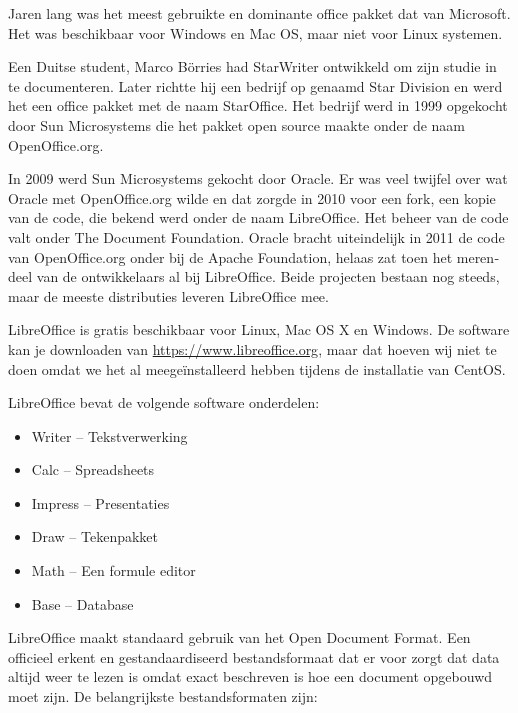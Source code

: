 Jaren lang was het meest gebruikte en dominante office pakket dat van Microsoft. Het was
beschikbaar voor Windows en Mac OS, maar niet voor Linux systemen.

Een Duitse student, Marco B\"orries had StarWriter ontwikkeld om zijn studie in te documenteren. Later richtte hij een bedrijf op genaamd Star
Division en werd het een office pakket met de naam StarOffice. Het bedrijf werd in 1999 opgekocht door Sun Microsystems
die het pakket open source maakte onder de naam OpenOffice.org.

{
\foreignlanguage{dutch}{In 2009 werd Sun Microsystems gekocht door Oracle. Er was veel twijfel over wat Oracle met
OpenOffice.org wilde en dat zorgde in 2010 voor een fork, een kopie van de code, die bekend werd onder de naam LibreOffice. Het beheer van de code valt onder The Document Foundation. Oracle bracht }\foreignlanguage{dutch}{uiteindelijk in 2011 de code
van OpenOffice.org onder bij de Apache Foundation, helaas zat toen het merendeel van de ontwikkelaars al bij
LibreOffice. Beide projecten bestaan nog steeds, maar de meeste distributies leveren LibreOffice mee.}}

{
\foreignlanguage{dutch}{LibreOffice is gratis
beschikbaar voor Linux, Mac OS X en Windows. De software kan je downloaden van
}\href{https://www.libreoffice.org/}{https://www.libreoffice.org}\foreignlanguage{dutch}{, maar dat hoeven wij niet te
doen omdat we het al meege\"installeerd hebben tijdens de installatie van CentOS.}}

{
LibreOffice bevat de volgende software onderdelen:}

\begin{itemize}
\item {
Writer -- Tekstverwerking}
\item {
Calc -- Spreadsheets}
\item {
Impress -- Presentaties}
\item {
Draw -- Tekenpakket}
\item {
Math -- Een formule editor}
\item {
Base -- Database}
\end{itemize}
{
LibreOffice maakt standaard gebruik van het Open Document Format. Een officieel erkent en gestandaardiseerd
bestandsformaat dat er voor zorgt dat data altijd weer te lezen is omdat exact beschreven is hoe een document opgebouwd
moet zijn. De belangrijkste bestandsformaten zijn:}

